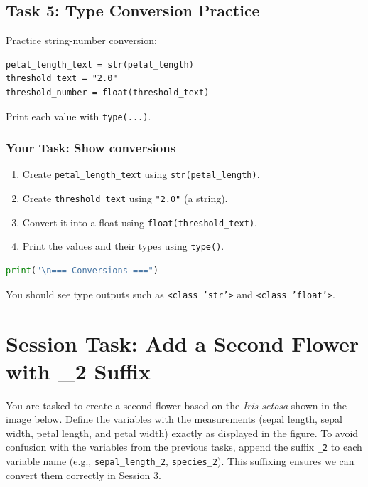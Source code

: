 \subsection{Task 5: Type Conversion Practice}
Practice string-number conversion:
\begin{verbatim}
petal_length_text = str(petal_length)
threshold_text = "2.0"
threshold_number = float(threshold_text)
\end{verbatim}

Print each value with \texttt{type(...)}.

\subsubsection{Your Task: Show conversions}
\begin{enumerate}
    \item Create \texttt{petal\_length\_text} using \texttt{str(petal\_length)}.
    \item Create \texttt{threshold\_text} using \texttt{"2.0"} (a string).
    \item Convert it into a float using \texttt{float(threshold\_text)}.
    \item Print the values and their types using \texttt{type()}.
\end{enumerate}

\begin{lstlisting}[language=Python]
print("\n=== Conversions ===")
\end{lstlisting}

\begin{tcolorbox}[title=Checkpoint]
You should see type outputs such as \texttt{<class 'str'>} and \texttt{<class 'float'>}.
\end{tcolorbox}

\section{Session Task: Add a Second Flower with \_2 Suffix}

You are tasked to create a second flower based on the \textit{Iris setosa} shown in the image below. 
Define the variables with the measurements (sepal length, sepal width, petal length, and petal width) exactly as displayed in the figure. 
To avoid confusion with the variables from the previous tasks, append the suffix \texttt{\_2} to each variable name (e.g., \texttt{sepal\_length\_2}, \texttt{species\_2}). This suffixing ensures we can convert them correctly in Session 3.

